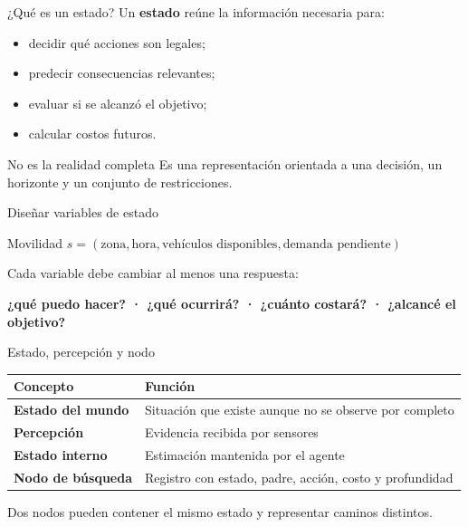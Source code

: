 \documentclass[aspectratio=169,11pt]{beamer}
\newcommand{\concepto}[1]{\textcolor{UAPTeal}{\textbf{#1}}}
\begin{document}
\begin{frame}{¿Qué es un estado?}
  Un \concepto{estado} reúne la información necesaria para:
  \begin{itemize}
    \item decidir qué acciones son legales;
    \item predecir consecuencias relevantes;
    \item evaluar si se alcanzó el objetivo;
    \item calcular costos futuros.
  \end{itemize}
  \vfill
  \begin{alertblock}{No es la realidad completa}
    Es una representación orientada a una decisión, un horizonte y un conjunto de restricciones.
  \end{alertblock}
\end{frame}

\begin{frame}{Diseñar variables de estado}
  \begin{block}{Movilidad}
    \centering $s=(\text{zona},\text{hora},\text{vehículos disponibles},\text{demanda pendiente})$
  \end{block}
  \centering
  \vfill
  Cada variable debe cambiar al menos una respuesta:
  \begin{center}
    \concepto{¿qué puedo hacer? · ¿qué ocurrirá? · ¿cuánto costará? · ¿alcancé el objetivo?}
  \end{center}
\end{frame}

\begin{frame}{Estado, percepción y nodo}
  \small
  \begin{tabularx}{\textwidth}{>{\bfseries}p{}X}
    \toprule
    Concepto & Función \\\midrule
    Estado del mundo & Situación que existe aunque no se observe por completo \\
    Percepción & Evidencia recibida por sensores \\
    Estado interno & Estimación mantenida por el agente \\
    Nodo de búsqueda & Registro con estado, padre, acción, costo y profundidad \\
    \bottomrule
  \end{tabularx}
  \vfill
  \alert{Dos nodos pueden contener el mismo estado y representar caminos distintos.}
\end{frame}
\end{document}
